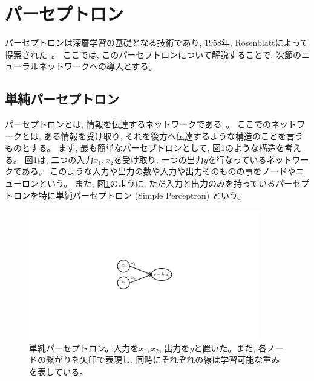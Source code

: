 \section{パーセプトロン} \label{DL:Perceptron}

パーセプトロンは深層学習の基礎となる技術であり, $1958$年, Rosenblattによって提案された~\cite{PerceptronPaper}。
ここでは, このパーセプトロンについて解説することで, 次節のニューラルネットワークへの導入とする。


\subsection{単純パーセプトロン} \label{DL:Percep:SimplePerceptron}

パーセプトロンとは, 情報を伝達するネットワークである~\cite{ZeroDeepLearning1}。
ここでのネットワークとは, ある情報を受け取り, それを後方へ伝達するような構造のことを言うものとする。
まず, 最も簡単なパーセプトロンとして, 図\ref{2SimplePerceptron}のような構造を考える。
図\ref{2SimplePerceptron}は, 二つの入力$x_1,x_2$を受け取り, 一つの出力$y$を行なっているネットワークである。
このような入力や出力の数や入力や出力そのものの事をノードやニューロンという。
また, 図\ref{2SimplePerceptron}のように, ただ入力と出力のみを持っているパーセプトロンを特に単純パーセプトロン (Simple Perceptron) という。

\begin{figure}[htbp]
 \centering
 \includegraphics[trim = 250 350 250 350, width=0.9\textwidth, clip]{Figure/2DeepLearning/2SimplePerceptron.png}
 \caption[単純パーセプトロン]{単純パーセプトロン。入力を$x_1,x_2$, 出力を$y$と置いた。また, 各ノードの繋がりを矢印で表現し, 同時にそれぞれの線は学習可能な重みを表している。}
 \label{2SimplePerceptron}
\end{figure}

